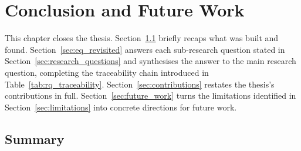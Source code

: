 %
%

\chapter{Conclusion and Future Work}
\label{chap:conclusion}

This chapter closes the thesis. Section~\ref{sec:conclusion_summary} briefly recaps what was built and found. Section~\ref{sec:eq_revisited} answers each sub-research question stated in Section~\ref{sec:research_questions} and synthesises the answer to the main research question, completing the traceability chain introduced in Table~\ref{tab:rq_traceability}. Section~\ref{sec:contributions} restates the thesis's contributions in full. Section~\ref{sec:future_work} turns the limitations identified in Section~\ref{sec:limitations} into concrete directions for future work.

\section{Summary}
\label{sec:conclusion_summary}

